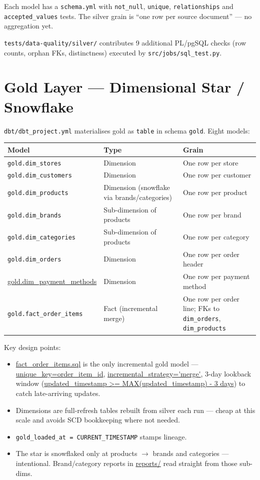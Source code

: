 \documentclass[11pt,a4paper]{article}
\begin{document}
Each model has a \texttt{schema.yml} with \texttt{not\_null}, \texttt{unique}, \texttt{relationships} and \texttt{accepted\_values} tests. The silver grain is ``one row per source document'' — no aggregation yet.

\texttt{tests/data-quality/silver/} contributes 9 additional PL/pgSQL checks (row counts, orphan FKs, distinctness) executed by \texttt{src/jobs/sql\_test.py}.

\section{Gold Layer — Dimensional Star / Snowflake}

\texttt{dbt/dbt\_project.yml} materialises gold as \texttt{table} in schema \texttt{gold}. Eight models:

\begin{center}
\begin{longtable}{>{\raggedright\arraybackslash}p{4.4cm} >{\raggedright\arraybackslash}p{3.6cm} >{\raggedright\arraybackslash}p{6.8cm}}
\toprule
Model & Type & Grain \\
\midrule
\endhead
\texttt{gold.dim\_stores} & Dimension & One row per store \\
\texttt{gold.dim\_customers} & Dimension & One row per customer \\
\texttt{gold.dim\_products} & Dimension (snowflake via brands/categories) & One row per product \\
\texttt{gold.dim\_brands} & Sub-dimension of products & One row per brand \\
\texttt{gold.dim\_categories} & Sub-dimension of products & One row per category \\
\texttt{gold.dim\_orders} & Dimension & One row per order header \\
\url{gold.dim_payment_methods} & Dimension & One row per payment method \\
\texttt{gold.fact\_order\_items} & Fact (incremental merge) & One row per order line; FKs to \texttt{dim\_orders}, \texttt{dim\_products} \\
\bottomrule
\end{longtable}
\end{center}

Key design points:
\begin{itemize}[leftmargin=1.4em]
  \item \url{fact_order_items.sql} is the only incremental gold model — \url{unique_key=order_item_id}, \url{incremental_strategy='merge'}, 3-day lookback window (\url{updated_timestamp >= MAX(updated_timestamp) - 3 days}) to catch late-arriving updates.
  \item Dimensions are full-refresh tables rebuilt from silver each run — cheap at this scale and avoids SCD bookkeeping where not needed.
  \item \texttt{gold\_loaded\_at = CURRENT\_TIMESTAMP} stamps lineage.
  \item The star is snowflaked only at products $\rightarrow$ brands and categories — intentional. Brand/category reports in \url{reports/} read straight from those sub-dims.
\end{itemize}
\end{document}
